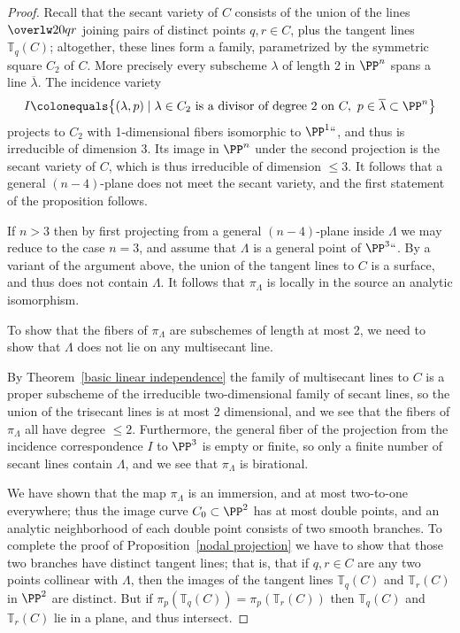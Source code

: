 \begin{proof} Recall that the
secant variety
%
of $C$ consists of the
union of the lines $\overlw20{qr}$ joining pairs of distinct points
$q,r \in C$, plus the tangent lines ${\mathbb T}_q(C)$; altogether,
these lines form a family, parametrized by the symmetric square $C_2$
of $C$. More precisely every subscheme $\lambda$ of
length 2 in $\PP^n$ spans a line $\overline \lambda$. The incidence
variety
$$
I\colonequals \bigl\{(\lambda, p)\mid \lambda\in C_2 \hbox{ is a divisor of
degree 2 on }C,\ p\in \overline \lambda\subset\PP^n\bigr\}
$$
projects to $C_2$ with 1-dimensional fibers isomorphic to $\PP^1` `$,
and thus
is irreducible of dimension 3. Its image in $\PP^n$ under the second
projection
is the secant variety of $C$, which is thus irreducible of dimension
$\leq 3$.
It follows that a general
$(n-4)$-plane does not meet the secant variety, and the first statement
of the proposition follows.

If $n>3$ then by first projecting from a general $(n-4)$-plane inside
$\Lambda$ we may reduce to the case $n=3$, and assume that $\Lambda$ is a
general point of $\PP^3` `$. By a variant of the argument above, the union
of the tangent lines to $C$ is a surface, and thus does not contain
$\Lambda$.
It follows that $\pi_\Lambda$ is locally in the source an analytic
isomorphism.

To show that the fibers of $\pi_\Lambda$ are subschemes of length at
most 2,
we need to show that $\Lambda$ does not lie on any
%
multisecant line.

By Theorem~\ref{basic linear independence} the family of multisecant
lines to $C$ is a proper subscheme of the irreducible two-dimensional
family of secant lines, so the union of the trisecant lines is at most 2
dimensional, and we see that the fibers of $\pi_\Lambda$ all have degree
$\leq 2$. Furthermore, the general fiber of the projection
from the incidence correspondence $I$ to $\PP^3$ is empty or finite,
so only a finite number of secant lines contain $\Lambda$, and we see
that $\pi_\Lambda$ is birational.

We have shown that the map $\pi_\Lambda$ is an immersion, and at
most two-to-one everywhere; thus the image curve $C_0 \subset \PP^2$
has at most double points, and an analytic neighborhood of each
double point  consists of two smooth branches. To complete the proof
of Proposition~\ref{nodal projection} we have to show that those two
branches have distinct tangent lines; that is, that
if $q, r \in C$ are any two points collinear with $\Lambda$, then the
images of the tangent lines ${\mathbb T}_q(C)$ and ${\mathbb T}_r(C)$ in
$\PP^2$ are distinct. But if  $\pi_p({\mathbb T}_q(C)) = \pi_p({\mathbb
T}_r(C))$ then  ${\mathbb T}_q(C)$ and ${\mathbb T}_r(C)$ lie in a plane,
and thus intersect.


\end{proof}
